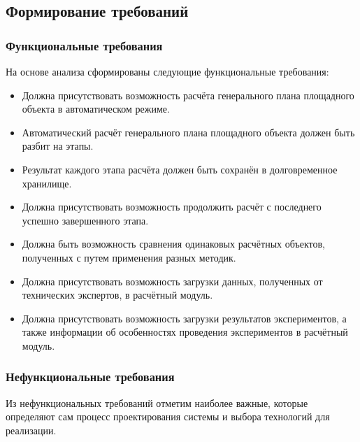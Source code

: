 \subsection{\large{Формирование требований}}

\subsubsection{Функциональные требования}

На основе анализа сформированы следующие функциональные требования:
\begin{itemize}
    \item {
        Должна присутствовать возможность расчёта генерального плана площадного объекта в автоматическом режиме.
    }
    \item {
        Автоматический расчёт генерального плана площадного объекта должен быть разбит на этапы.
    }
    \item {
        Результат каждого этапа расчёта должен быть сохранён в долговременное хранилище.
    }
    \item {
        Должна присутствовать возможность продолжить расчёт с последнего успешно завершенного этапа.
    }
    \item {
        Должна быть возможность сравнения одинаковых расчётных объектов, полученных с путем применения разных методик.
    }
    \item {
        Должна присутствовать возможность загрузки данных, полученных от технических экспертов, в расчётный модуль.
    }
    \item {
        Должна присутствовать возможность загрузки результатов экспериментов, а также информации об особенностях
        проведения экспериментов в расчётный модуль.
    }
\end{itemize}

\subsubsection{\large{Нефункциональные требования}}

Из нефункциональных требований отметим наиболее важные, которые определяют сам процесс проектирования системы
и выбора технологий для реализации.

